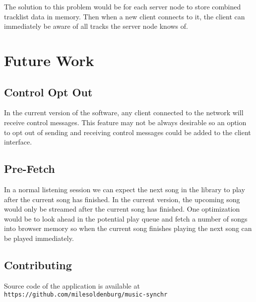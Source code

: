 \documentclass[12pt]{article}
\begin{document}
The solution to this problem would be for each server node to store combined tracklist data in memory. Then when a new client connects to it, the client can immediately be aware of all tracks the server node knows of.

\section{Future Work}

\subsection{Control Opt Out}
In the current version of the software, any client connected to the network will receive control messages. This feature may not be always desirable so an option to opt out of sending and receiving control messages could be added to the client interface.

\subsection{Pre-Fetch}
In a normal listening session we can expect the next song in the library to play after the current song has finished. In the current version, the upcoming song would only be streamed after the current song has finished. One optimization would be to look ahead in the potential play queue and fetch a number of songs into browser memory so when the current song finishes playing the next song can be played immediately.

\subsection{Contributing}
\begin{center}
Source code of the application is available at
{\tt https://github.com/milesoldenburg/music-synchr}
\end{center}
\end{document}
